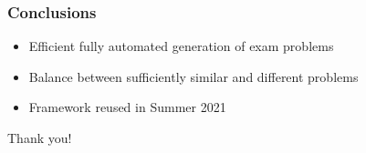 \documentclass[xcolor={table}]{beamer}
\begin{document}

\begin{frame}
\frametitle{Conclusions}

  \begin{itemize}
    \item Efficient fully automated generation of exam problems %
    \item Balance between sufficiently similar and different problems
    \item Framework reused in Summer 2021
  \end{itemize}

\bigskip
\pause

\begin{center}
    Thank you!
\end{center}
\end{frame}

\end{document}
